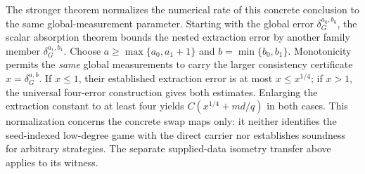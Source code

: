 \documentclass[11pt]{article}
\begin{document}
The stronger theorem 
normalizes the numerical rate of this concrete conclusion to the same
global-measurement parameter. Starting with the global error
$\delta_G^{a_0,b_0}$, the scalar absorption theorem bounds the nested
extraction error by another family member $\delta_G^{a_1,b_1}$. Choose
$a\geq\max\{a_0,a_1+1\}$ and $b=\min\{b_0,b_1\}$. Monotonicity permits the
\emph{same} global measurements to carry the larger consistency certificate
$x=\delta_G^{a,b}$. If $x\leq1$, their established extraction error is at
most $x\leq x^{1/4}$; if $x>1$, the universal four-error construction gives
both estimates. Enlarging the extraction constant to at least four yields
$C(x^{1/4}+md/q)$ in both cases. This normalization concerns the concrete
swap maps only: it neither identifies the seed-indexed low-degree game with
the direct carrier nor establishes soundness for arbitrary strategies. The
separate supplied-data isometry transfer above applies to its witness.
\end{document}
